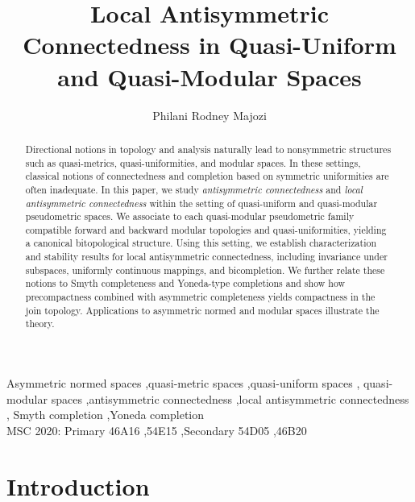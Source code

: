 \documentclass[preprint,12pt]{elsarticle}
\begin{document}
\begin{frontmatter}

\title{Local Antisymmetric Connectedness in Quasi-Uniform and Quasi-Modular Spaces}

\author{Philani Rodney Majozi}
\address{Department of Mathematics, Pure and Applied Analytics,
North-West University, Mahikeng, South Africa}

\begin{abstract}
Directional notions in topology and analysis naturally lead to
nonsymmetric structures such as quasi-metrics, quasi-uniformities, and
modular spaces. In these settings, classical notions of connectedness
and completion based on symmetric uniformities are often inadequate.
In this paper, we study \emph{antisymmetric connectedness} and
\emph{local antisymmetric connectedness} within the setting of
quasi-uniform and quasi-modular pseudometric spaces. We associate to
each quasi-modular pseudometric family compatible forward and backward
modular topologies and quasi-uniformities, yielding a canonical
bitopological structure. Using this setting, we establish
characterization and stability results for local antisymmetric
connectedness, including invariance under subspaces, uniformly
continuous mappings, and bicompletion. We further relate these notions
to Smyth completeness and Yoneda-type completions and show how
precompactness combined with asymmetric completeness yields compactness
in the join topology. Applications to asymmetric normed and modular
spaces illustrate the theory.
\end{abstract}


\begin{keyword}
Asymmetric normed spaces \sep quasi-metric spaces \sep quasi-uniform spaces \sep
quasi-modular spaces \sep antisymmetric connectedness \sep local antisymmetric connectedness \sep
Smyth completion \sep Yoneda completion
\\[2pt]
MSC 2020: Primary 46A16 \sep 54E15 \sep Secondary 54D05 \sep 46B20
\end{keyword}



\end{frontmatter}
\section{Introduction}\label{sec:intro}
\end{document}
